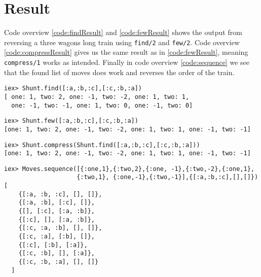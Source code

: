 \documentclass[a4paper,11pt]{article}
\newenvironment{code}{\captionsetup{type=listing}}{}
\begin{document}
\section*{Result}
Code overview \ref{code:findResult} and \ref{code:fewResult} shows the output from reversing a three wagons long train 
using {\tt find/2} and {\tt few/2}.
Code overview \ref{code:compressResult} gives us the same result as in \ref{code:fewResult}, meaning {\tt compress/1} 
works as intended.
Finally in code overview \ref{code:sequence} we see that the found list of moves does work and reverses the order of the 
train.  

\begin{code}
\label{code:findResult}
\begin{verbatim}
iex> Shunt.find([:a,:b,:c],[:c,:b,:a])
[ one: 1, two: 2, one: -1, two: -2, one: 1, two: 1,
  one: -1, two: -1, one: 1, two: 0, one: -1, two: 0]
\end{verbatim}
\end{code}

\begin{code}
\label{code:fewResult}
\begin{verbatim}
iex> Shunt.few([:a,:b,:c],[:c,:b,:a])
[one: 1, two: 2, one: -1, two: -2, one: 1, two: 1, one: -1, two: -1]
\end{verbatim}
\end{code}

\begin{code}
\label{code:compressResult}
\begin{verbatim}
iex> Shunt.compress(Shunt.find([:a,:b,:c],[:c,:b,:a]))
[one: 1, two: 2, one: -1, two: -2, one: 1, two: 1, one: -1, two: -1]
\end{verbatim}
\end{code}

\begin{code}
\label{code:sequence}
\begin{verbatim}
iex> Moves.sequence([{:one,1},{:two,2},{:one, -1},{:two,-2},{:one,1},
                    {:two,1}, {:one,-1},{:two,-1}],{[:a,:b,:c],[],[]})
[
    {[:a, :b, :c], [], []},
    {[:a, :b], [:c], []},
    {[], [:c], [:a, :b]},
    {[:c], [], [:a, :b]},
    {[:c, :a, :b], [], []},
    {[:c, :a], [:b], []},
    {[:c], [:b], [:a]},
    {[:c, :b], [], [:a]},
    {[:c, :b, :a], [], []}
  ]
\end{verbatim}
\end{code}
\end{document}
